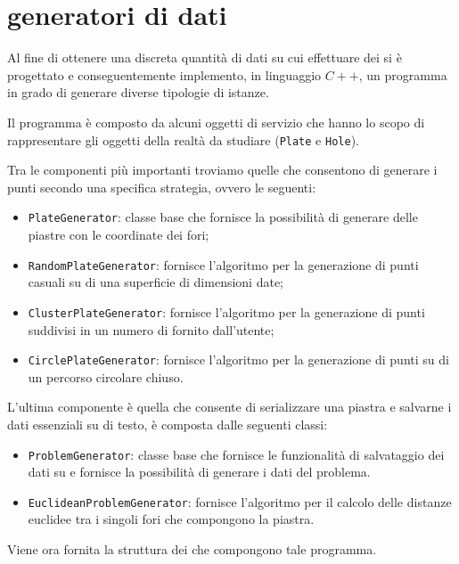 %
%
\section[Generatori di dati]{generatori di dati}
\label{pt1:generator}
Al fine di ottenere una discreta quantità di dati su cui effettuare dei  si è progettato e conseguentemente implemento, in linguaggio $C++$,
un programma in grado di generare diverse tipologie di istanze.

Il programma è composto da alcuni oggetti di servizio che hanno lo scopo di rappresentare gli oggetti della realtà da studiare (\texttt{Plate} e \texttt{Hole}).

Tra le componenti più importanti troviamo quelle che consentono di generare i punti secondo una specifica strategia, ovvero le seguenti:

\begin{itemize}
\item\texttt{PlateGenerator}: classe base che fornisce la possibilità di generare delle piastre con le coordinate dei fori;
\item\texttt{RandomPlateGenerator}: fornisce l'algoritmo per la generazione di punti casuali su di una superficie di dimensioni date;
\item\texttt{ClusterPlateGenerator}: fornisce l'algoritmo per la generazione di punti suddivisi in un numero di  fornito dall'utente;
\item\texttt{CirclePlateGenerator}: fornisce l'algoritmo per la generazione di punti su di un percorso circolare chiuso.
\end{itemize}

L'ultima componente è quella che consente di serializzare una piastra e salvarne i dati essenziali su  di testo, è composta dalle seguenti classi:

\begin{itemize}
\item\texttt{ProblemGenerator}: classe base che fornisce le funzionalità di salvataggio dei dati su  e fornisce la possibilità di generare i dati del problema.
\item\texttt{EuclideanProblemGenerator}: fornisce l'algoritmo per il calcolo delle distanze euclidee tra i singoli fori che compongono la piastra.
\end{itemize}

Viene ora fornita la struttura dei  che compongono tale programma.

